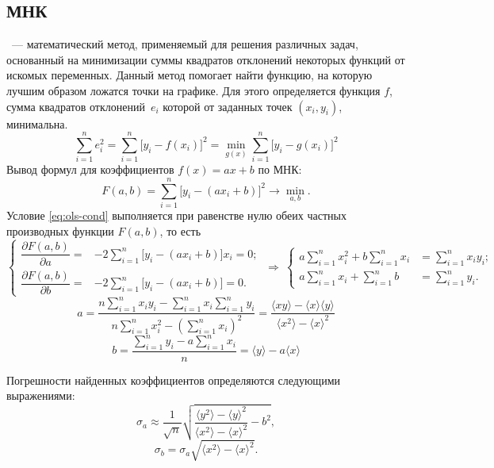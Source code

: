 \subsection{МНК}
~--- математический метод, применяемый для решения различных задач, основанный на минимизации суммы квадратов отклонений некоторых функций от искомых переменных. Данный метод помогает найти функцию, на которую лучшим образом ложатся точки на графике. Для этого определяется функция $f$, сумма квадратов отклонений~$e_i$ которой от заданных точек $\left( x_i, y_i \right)$, минимальна.
\begin{equation}
\sum\limits_{i=1}^n e_i^2 = \sum\limits_{i=1}^n \bigl[ y_i - f(x_i) \bigr]^2 = \min_{g(x)} \sum\limits_{i=1}^n \bigl[y_i - g(x_i) \bigr]^2
\label{eq:ols-cond}
\end{equation}
Вывод формул для коэффициентов  $f(x) = ax + b$ по МНК:
\begin{equation*}
F(a,b) = \sum\limits_{i=1}^n \bigl[y_i-(ax_i + b) \bigr]^2 \rightarrow \min_{a, b}.
\end{equation*}
Условие \eqref{eq:ols-cond} выполняется при равенстве нулю обеих частных производных функции $F(a, b)$, то есть
\begin{equation*}
\left\{ \begin{aligned}
\dfrac{\partial  F(a,b)}{\partial a} =& -2\sum\limits_{i=1}^n \bigl[ y_i-(ax_i + b) \bigr] x_i = 0;\\
\dfrac{\partial  F(a,b)}{\partial b} =& -2\sum\limits_{i=1}^n \bigl[ y_i-(ax_i + b) \bigr] = 0.
\end{aligned} \right. ~\Longrightarrow~
\left\{ \begin{aligned}
a \sum\limits_{i=1}^n x_i^2 + b \sum\limits_{i=1}^n x_i &= \sum\limits_{i=1}^n x_i y_i;\\
 a\sum\limits_{i=1}^n x_i + \sum\limits_{i=1}^n b &= \sum\limits_{i=1}^n y_i.
\end{aligned} \right.
\end{equation*}
\begin{equation}
a = \dfrac{n\sum\limits_{i=1}^n x_i y_i - \sum\limits_{i=1}^n x_i \sum\limits_{i=1}^n y_i}{n \sum\limits_{i=1}^n x_i^2 - \left(\sum\limits_{i=1}^n x_i\right)^2} 
= \dfrac{\langle xy \rangle -\langle x\rangle \langle y \rangle}{\langle x^2 \rangle - \langle x \rangle^2}
\end{equation}
\begin{equation}
b = \dfrac{\sum\limits_{i=1}^n y_i - a \sum\limits_{i=1}^n x_i}{n} 
= \langle y \rangle - a \langle x \rangle
\end{equation}

Погрешности найденных коэффициентов определяются следующими выражениями:
\begin{equation}
	\sigma_a \approx \frac{1}{\sqrt{n}} \sqrt{\dfrac{\langle y^2 \rangle - \langle y \rangle^2}{\langle x^2 \rangle - \langle x \rangle^2} - b^2},
\end{equation}
\begin{equation}
	\sigma_b = \sigma_a \sqrt{\langle x^2 \rangle - \langle x \rangle^2}.	
\end{equation}
